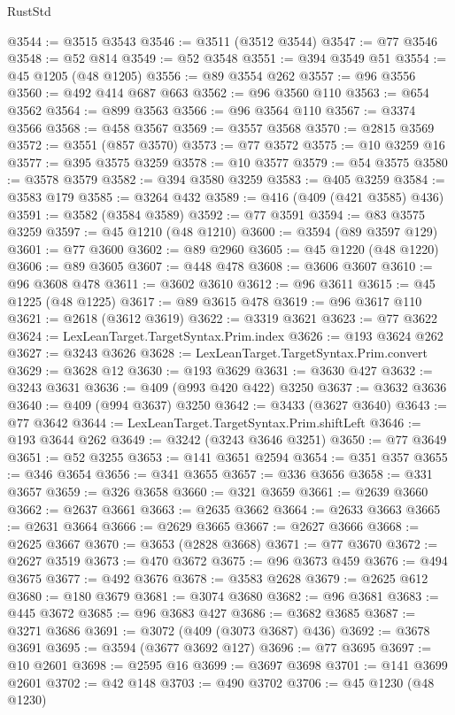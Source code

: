 \begin{lexlean}{RustStd}
\begin{coremodule}
@3544 := @3515 @3543
@3546 := @3511 (@3512 @3544)
@3547 := @77 @3546
@3548 := @52 @814
@3549 := @52 @3548
@3551 := @394 @3549 @51
@3554 := @45 @1205 (@48 @1205)
@3556 := @89 @3554 @262
@3557 := @96 @3556
@3560 := @492 @414 @687 @663
@3562 := @96 @3560 @110
@3563 := @654 @3562
@3564 := @899 @3563
@3566 := @96 @3564 @110
@3567 := @3374 @3566
@3568 := @458 @3567
@3569 := @3557 @3568
@3570 := @2815 @3569
@3572 := @3551 (@857 @3570)
@3573 := @77 @3572
@3575 := @10 @3259 @16
@3577 := @395 @3575 @3259
@3578 := @10 @3577
@3579 := @54 @3575
@3580 := @3578 @3579
@3582 := @394 @3580 @3259
@3583 := @405 @3259
@3584 := @3583 @179
@3585 := @3264 @432
@3589 := @416 (@409 (@421 @3585) @436)
@3591 := @3582 (@3584 @3589)
@3592 := @77 @3591
@3594 := @83 @3575 @3259
@3597 := @45 @1210 (@48 @1210)
@3600 := @3594 (@89 @3597 @129)
@3601 := @77 @3600
@3602 := @89 @2960
@3605 := @45 @1220 (@48 @1220)
@3606 := @89 @3605
@3607 := @448 @478
@3608 := @3606 @3607
@3610 := @96 @3608 @478
@3611 := @3602 @3610
@3612 := @96 @3611
@3615 := @45 @1225 (@48 @1225)
@3617 := @89 @3615 @478
@3619 := @96 @3617 @110
@3621 := @2618 (@3612 @3619)
@3622 := @3319 @3621
@3623 := @77 @3622
@3624 := LexLeanTarget.TargetSyntax.Prim.index
@3626 := @193 @3624 @262
@3627 := @3243 @3626
@3628 := LexLeanTarget.TargetSyntax.Prim.convert
@3629 := @3628 @12
@3630 := @193 @3629
@3631 := @3630 @427
@3632 := @3243 @3631
@3636 := @409 (@993 @420 @422) @3250
@3637 := @3632 @3636
@3640 := @409 (@994 @3637) @3250
@3642 := @3433 (@3627 @3640)
@3643 := @77 @3642
@3644 := LexLeanTarget.TargetSyntax.Prim.shiftLeft
@3646 := @193 @3644 @262
@3649 := @3242 (@3243 @3646 @3251)
@3650 := @77 @3649
@3651 := @52 @3255
@3653 := @141 @3651 @2594
@3654 := @351 @357
@3655 := @346 @3654
@3656 := @341 @3655
@3657 := @336 @3656
@3658 := @331 @3657
@3659 := @326 @3658
@3660 := @321 @3659
@3661 := @2639 @3660
@3662 := @2637 @3661
@3663 := @2635 @3662
@3664 := @2633 @3663
@3665 := @2631 @3664
@3666 := @2629 @3665
@3667 := @2627 @3666
@3668 := @2625 @3667
@3670 := @3653 (@2828 @3668)
@3671 := @77 @3670
@3672 := @2627 @3519
@3673 := @470 @3672
@3675 := @96 @3673 @459
@3676 := @494 @3675
@3677 := @492 @3676
@3678 := @3583 @2628
@3679 := @2625 @612
@3680 := @180 @3679
@3681 := @3074 @3680
@3682 := @96 @3681
@3683 := @445 @3672
@3685 := @96 @3683 @427
@3686 := @3682 @3685
@3687 := @3271 @3686
@3691 := @3072 (@409 (@3073 @3687) @436)
@3692 := @3678 @3691
@3695 := @3594 (@3677 @3692 @127)
@3696 := @77 @3695
@3697 := @10 @2601
@3698 := @2595 @16
@3699 := @3697 @3698
@3701 := @141 @3699 @2601
@3702 := @42 @148
@3703 := @490 @3702
@3706 := @45 @1230 (@48 @1230)

\end{coremodule}
\end{lexlean}
